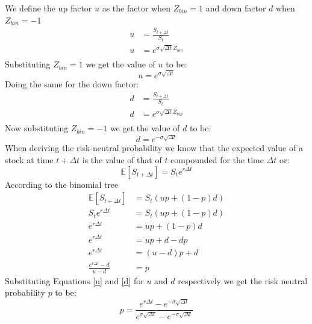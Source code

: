 \documentclass[12pt]{article}
\numberwithin{equation}{section}
\begin{document}
\newpage
We define the up factor $u$ as the factor when $Z_{bin} = 1$ and down factor $d$ when $Z_{bin} = -1$ 
\begin{equation*}
	\begin{aligned}
	u &= \frac{S_{t+ \Delta t}}{S_t} \\
	u &= e^{\sigma  \sqrt{\Delta t} Z_{bin}} \\
	\end{aligned}
\end{equation*}
Substituting $Z_{bin} = 1$ we get the value of $u$ to be:
\begin{equation}
		u = e^{\sigma  \sqrt{\Delta t}}
		\label{u}
\end{equation}
Doing the same for the down factor:
\begin{equation*}
	\begin{aligned}
		d &= \frac{S_{t+ \Delta t}}{S_t} \\
		d &= e^{\sigma  \sqrt{\Delta t} Z_{bin}} \\
		\end{aligned}
\end{equation*}
Now substituting $Z_{bin} = -1$ we get the value of $d$ to be:
\begin{equation}
		d = e^{-\sigma  \sqrt{\Delta t}}
		\label{d}
\end{equation}
When deriving the risk-neutral probability we know that the expected value of a stock at time $t + \Delta t$ is the value of that of $t$ compounded for the time $\Delta t$ or:
\begin{equation}
	\mathbb{E}[S_{t + \Delta t}] = S_{t} e ^{r\Delta t}
\end{equation}
According to the binomial tree
\begin{equation*}
	\begin{aligned}
	\mathbb{E}[S_{t + \Delta t}] &= S_t (u p + (1-p)d) \\
	 S_{t} e ^{r\Delta t} &= S_t (u p + (1-p)d) \\
	 e ^{r\Delta t} &= u p + (1-p)d \\
	 e ^{r\Delta t} &= u p + d- d p \\
	 e ^{r\Delta t} &= (u -d) p + d \\
	 \frac{e ^{r\Delta t} - d}{u -d}  &= p
	\end{aligned}
\end{equation*}
Substituting Equations \ref{u} and \ref{d} for $u$ and $d$ respectively we get the risk neutral probability $p$ to be:
\begin{equation}
		p = \frac{e ^{r\Delta t} - e^{-\sigma  \sqrt{\Delta t}}}{e^{\sigma  \sqrt{\Delta t}} -e^{-\sigma  \sqrt{\Delta t}}}  
		\label{pBS}
\end{equation}
\end{document}

